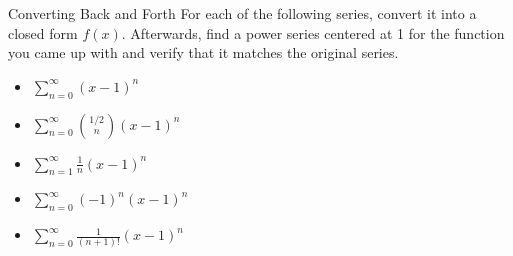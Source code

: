 \begin{exercise}{Converting Back and Forth \Coffeecup \Coffeecup \Coffeecup}
For each of the following series, convert it into a closed form $f(x)$.  Afterwards, find a power series centered at 1 for the function you came up with and verify that it matches the original series.
\begin{itemize}
\item $\sum_{n=0}^\infty (x-1)^n $
\vspace*{1in}
\item $\sum_{n=0}^\infty \binom{1/2}{n}(x-1)^n $
\vspace*{1in}
\item $\sum_{n=1}^\infty \frac{1}{n}(x-1)^n $
\vspace*{1in}
\item $\sum_{n=0}^\infty (-1)^n(x-1)^n $
\vspace*{1in}
\item $\sum_{n=0}^\infty \frac{1}{(n+1)!}(x-1)^n $
\vspace*{1in}
\end{itemize} 
\end{exercise}

